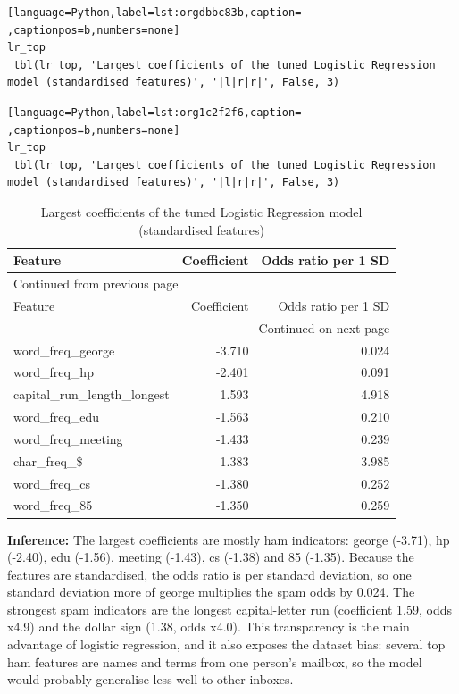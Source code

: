 \documentclass[11pt]{article}
\begin{document}
\begin{lstlisting}[language=Python,label=lst:orgdbbc83b,caption= ,captionpos=b,numbers=none]
lr_top
_tbl(lr_top, 'Largest coefficients of the tuned Logistic Regression model (standardised features)', '|l|r|r|', False, 3)
\end{lstlisting}
\begin{lstlisting}[language=Python,label=lst:org1c2f2f6,caption= ,captionpos=b,numbers=none]
lr_top
_tbl(lr_top, 'Largest coefficients of the tuned Logistic Regression model (standardised features)', '|l|r|r|', False, 3)
\end{lstlisting}

\begin{longtable}{|l|r|r|}
\caption{Largest coefficients of the tuned Logistic Regression model (standardised features)}
\\[0pt]
\hline
Feature & Coefficient & Odds ratio per 1 SD\\[0pt]
\hline
\endfirsthead
\multicolumn{3}{l}{Continued from previous page} \\[0pt]
\hline

Feature & Coefficient & Odds ratio per 1 SD \\[0pt]

\hline
\endhead
\hline\multicolumn{3}{r}{Continued on next page} \\
\endfoot
\endlastfoot
\hline
word\_freq\_george & -3.710 & 0.024\\[0pt]
\hline
word\_freq\_hp & -2.401 & 0.091\\[0pt]
\hline
capital\_run\_length\_longest & 1.593 & 4.918\\[0pt]
\hline
word\_freq\_edu & -1.563 & 0.210\\[0pt]
\hline
word\_freq\_meeting & -1.433 & 0.239\\[0pt]
\hline
char\_freq\_\$ & 1.383 & 3.985\\[0pt]
\hline
word\_freq\_cs & -1.380 & 0.252\\[0pt]
\hline
word\_freq\_85 & -1.350 & 0.259\\[0pt]
\hline
\end{longtable}

\textbf{Inference:} The largest coefficients are mostly ham indicators: george (-3.71), hp (-2.40), edu (-1.56),
meeting (-1.43), cs (-1.38) and 85 (-1.35). Because the features are standardised, the odds
ratio is per standard deviation, so one standard deviation more of george multiplies the
spam odds by 0.024. The strongest spam indicators are the longest capital-letter run
(coefficient 1.59, odds x4.9) and the dollar sign (1.38, odds x4.0). This transparency is
the main advantage of logistic regression, and it also exposes the dataset bias: several top
ham features are names and terms from one person's mailbox, so the model would probably
generalise less well to other inboxes.
\end{document}
